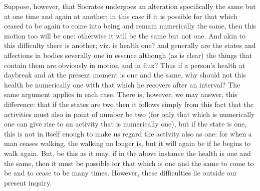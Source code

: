 Suppose, however, that Socrates undergoes an alteration specifically
the same but at one time and again at another: in this case if it
is possible for that which ceased to be again to come into being and
remain numerically the same, then this motion too will be one: otherwise
it will be the same but not one. And akin to this difficulty there
is another; viz. is health one? and generally are the states and affections
in bodies severally one in essence although (as is clear) the things
that contain them are obviously in motion and in flux? Thus if a person's
health at daybreak and at the present moment is one and the same,
why should not this health be numerically one with that which he recovers
after an interval? The same argument applies in each case. There is,
however, we may answer, this difference: that if the states are two
then it follows simply from this fact that the activities must also
in point of number be two (for only that which is numerically one
can give rise to an activity that is numerically one), but if the
state is one, this is not in itself enough to make us regard the activity
also as one: for when a man ceases walking, the walking no longer
is, but it will again be if he begins to walk again. But, be this
as it may, if in the above instance the health is one and the same,
then it must be possible for that which is one and the same to come
to be and to cease to be many times. However, these difficulties lie
outside our present inquiry. 

